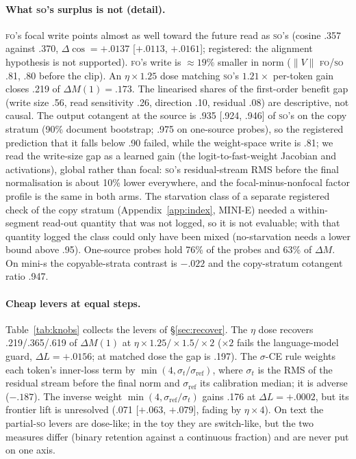 \documentclass[11pt]{article}
\newcommand{\FO}{\textsc{fo}}
\newcommand{\SO}{\textsc{so}}
\begin{document}
\paragraph{What \SO's surplus is not (detail).} \FO's focal write points almost as well toward the
future read as \SO's (cosine .357 against .370, $\Delta\cos=+.0137$ [$+.0113$, $+.0161$]; registered: the
alignment hypothesis is not supported). \FO's write is $\approx19\%$ smaller in norm ($\lVert V\rVert$
\FO/\SO{} .81, .80 before the clip). An $\eta\times1.25$ dose matching \SO's $1.21\times$ per-token gain
closes .219 of $\Delta M(1)=.173$. The linearised shares of the first-order benefit gap (write size
.56, read sensitivity .26, direction .10, residual .08) are descriptive, not causal. The output
cotangent at the source is .935 [.924, .946] of \SO's on the copy stratum (90\% document bootstrap; .975 on one-source probes), so the registered prediction that it falls below .90 failed, while the weight-space write is .81; we read the write-size gap
as a learned gain (the logit-to-fast-weight Jacobian and activations), global rather than focal: \SO's
residual-stream RMS before the final normalisation is about 10\% lower everywhere, and the
focal-minus-nonfocal factor profile is the same in both arms. The starvation class of a separate
registered check of the copy stratum (Appendix~\ref{app:index}, MINI-E) needed a within-segment read-out quantity that was not logged, so it is not
evaluable; with that quantity logged the class could only have been mixed (no-starvation needs a lower
bound above .95). One-source probes hold 76\% of the probes and 63\% of $\Delta M$. On mini-s the
copyable-strata contrast is $-.022$ and the copy-stratum cotangent ratio .947.

\paragraph{Cheap levers at equal steps.} Table~\ref{tab:knobs} collects the levers of
\S\ref{sec:recover}. The $\eta$ dose recovers .219/.365/.619 of $\Delta M(1)$ at
$\eta\times1.25/\times1.5/\times2$ ($\times2$ fails the language-model guard, $\Delta L=+.0156$; at
matched dose the gap is .197). The $\sigma$-CE rule weights each token's inner-loss term by
$\min(4,\sigma_t/\sigma_{\text{ref}})$, where $\sigma_t$ is the RMS of the residual stream before the
final norm and $\sigma_{\text{ref}}$ its calibration median; it is adverse ($-.187$). The inverse
weight $\min(4,\sigma_{\text{ref}}/\sigma_t)$ gains .176 at $\Delta L=+.0002$, but its frontier lift is
unresolved (.071 [$+.063$, $+.079$], fading by $\eta\times4$). On text the partial-\SO{} levers are
dose-like; in the toy they are switch-like, but the two measures differ (binary retention against a
continuous fraction) and are never put on one axis.
\end{document}
